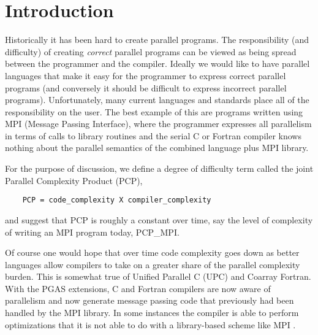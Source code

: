 \section{Introduction}

Historically it has been hard to create parallel programs.  The responsibility (and difficulty) of
creating \emph{correct} parallel programs can be viewed as being spread between the programmer and
the compiler.  Ideally we would like to have parallel languages that make it easy for the
programmer to express correct parallel programs (and conversely it should be difficult to express
incorrect parallel programs).  Unfortunately, many current languages and standards place all of the
responsibility on the user.  The best example of this are programs written using MPI (Message
Passing Interface), where the programmer expresses all parallelism in terms of calls to library
routines and the serial C or Fortran compiler knows nothing about the parallel semantics of the
combined language plus MPI library.

For the purpose of discussion, we define a degree of difficulty term called the joint Parallel
Complexity Product (PCP),

\begin{verbatim}
    PCP = code_complexity X compiler_complexity
\end{verbatim}
and suggest that PCP is roughly a constant over time, say the level of complexity of writing an MPI
program today, PCP\_MPI.

Of course one would hope that over time code complexity goes down as better languages allow
compilers to take on a greater share of the parallel complexity burden.  This is somewhat true of
Unified Parallel C (UPC) and Coarray Fortran.  With the PGAS extensions, C and Fortran compilers
are now aware of parallelism and now generate message passing code that previously had been handled
by the MPI library.  In some instances the compiler is able to perform optimizations that it is not
able to do with a library-based scheme like MPI \cite{preissl:2011:SC}.


